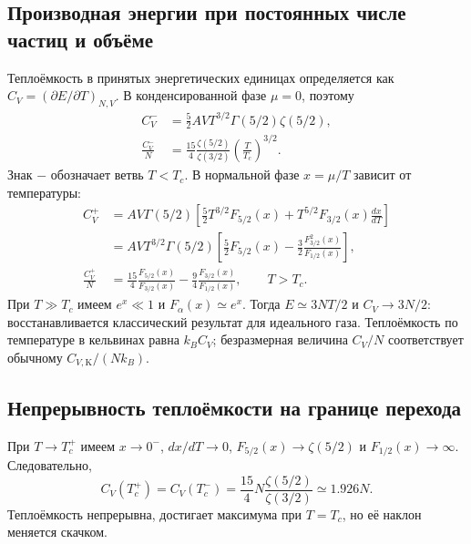 \documentclass[../final.tex]{subfiles}
\begin{document}
\clearpage
\subsection{Производная энергии при постоянных числе частиц и объёме}
Теплоёмкость в принятых энергетических единицах определяется как
$C_V=(\partial E/\partial T)_{N,V}$.
В конденсированной фазе $\mu=0$, поэтому
\begin{align*}
 C_V^-&=\frac52 AVT^{3/2}\Gamma(5/2)\zeta(5/2),\\
 \frac{C_V^-}{N}&=\frac{15}{4}\frac{\zeta(5/2)}{\zeta(3/2)}
 \left(\frac{T}{T_c}\right)^{3/2}.
\end{align*}
Знак $-$ обозначает ветвь $T<T_c$. В нормальной фазе
$x=\mu/T$ зависит от температуры:
\begin{align*}
 C_V^+&=AV\Gamma(5/2)
 \left[\frac52T^{3/2}F_{5/2}(x)
 +T^{5/2}F_{3/2}(x)\frac{dx}{dT}\right]\\
 &=AVT^{3/2}\Gamma(5/2)
 \left[\frac52F_{5/2}(x)-\frac32\frac{F_{3/2}^2(x)}{F_{1/2}(x)}\right],\\
 \frac{C_V^+}{N}&=\frac{15}{4}\frac{F_{5/2}(x)}{F_{3/2}(x)}
 -\frac94\frac{F_{3/2}(x)}{F_{1/2}(x)},\qquad T>T_c.
\end{align*}
При $T\gg T_c$ имеем $e^x\ll1$ и $F_\alpha(x)\simeq e^x$.
Тогда $E\simeq3NT/2$ и $C_V\to3N/2$: восстанавливается
классический результат для идеального газа.
Теплоёмкость по температуре в кельвинах равна $k_BC_V$;
безразмерная величина $C_V/N$ соответствует обычному $C_{V,\mathrm K}/(Nk_B)$.

\clearpage
\subsection{Непрерывность теплоёмкости на границе перехода}
При $T\to T_c^+$ имеем $x\to0^{-}$, $dx/dT\to0$,
$F_{5/2}(x)\to\zeta(5/2)$ и $F_{1/2}(x)\to\infty$.
Следовательно,
\begin{equation*}
 C_V(T_c^+)=C_V(T_c^-)
 =\frac{15}{4}N\frac{\zeta(5/2)}{\zeta(3/2)}\simeq1.926N.
\end{equation*}
Теплоёмкость непрерывна, достигает максимума при $T=T_c$,
но её наклон меняется скачком.
\end{document}
